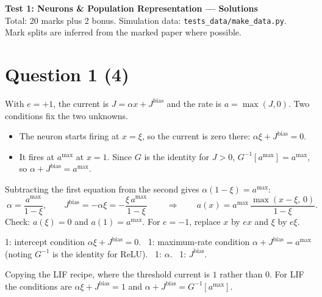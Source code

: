 \documentclass[11pt,letterpaper]{article}
\newcommand{\Jb}{J^{\mathrm{bias}}}
\begin{document}
\begin{center}
{\Large\bfseries Test 1: Neurons \& Population Representation --- Solutions}\\[2pt]
Total: 20 marks plus 2 bonus. Simulation data: \texttt{tests\_data/make\_data.py}.\\
Mark splits are inferred from the marked paper where possible.
\end{center}

\section*{Question 1 \hfill (4)}
With $e = +1$, the current is $J = \alpha x + \Jb$ and the rate is $a = \max(J, 0)$. Two conditions fix the two unknowns.
\begin{itemize}[leftmargin=1.2em]
\item The neuron starts firing at $x = \xi$, so the current is zero there: $\alpha\xi + \Jb = 0$.
\item It fires at $a^{\max}$ at $x = 1$. Since $G$ is the identity for $J > 0$, $G^{-1}[a^{\max}] = a^{\max}$, so $\alpha + \Jb = a^{\max}$.
\end{itemize}
Subtracting the first equation from the second gives $\alpha(1 - \xi) = a^{\max}$:
\[
\boxed{\ \alpha = \frac{a^{\max}}{1 - \xi}, \qquad \Jb = -\alpha\xi = -\frac{\xi\,a^{\max}}{1 - \xi}\ }
\qquad\Longrightarrow\qquad a(x) = a^{\max}\,\frac{\max(x - \xi,\,0)}{1 - \xi}.
\]
Check: $a(\xi) = 0$ and $a(1) = a^{\max}$. For $e = -1$, replace $x$ by $ex$ and $\xi$ by $e\xi$.
\begin{center}
\end{center}
\begin{marking}
1: intercept condition $\alpha\xi + \Jb = 0$. \ 1: maximum-rate condition $\alpha + \Jb = a^{\max}$ (noting $G^{-1}$ is the identity for ReLU). \ 1: $\alpha$. \ 1: $\Jb$.
\end{marking}
\begin{trap}
Copying the LIF recipe, where the threshold current is $1$ rather than $0$. For LIF the conditions are $\alpha\xi + \Jb = 1$ and $\alpha + \Jb = G^{-1}[a^{\max}]$.
\end{trap}
\end{document}
